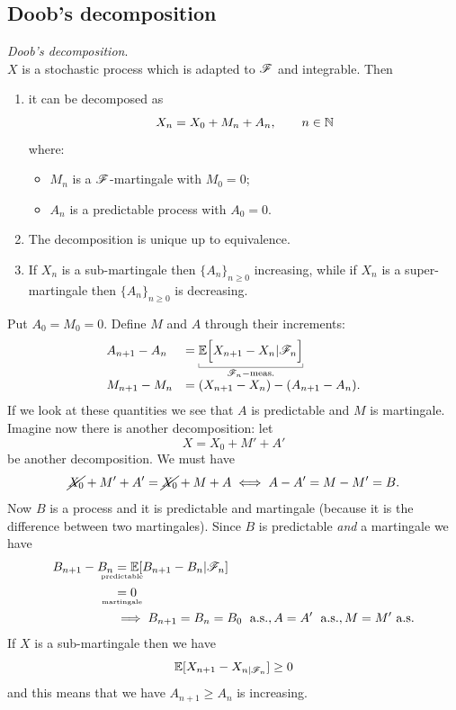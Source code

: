 \documentclass{report}
\begin{document}
\subsection{Doob’s decomposition}
\begin{theorem}
\emph{Doob's decomposition}.\\
$X$ is a stochastic process which is adapted to $\mathscr{F}$ and integrable. Then
\begin{enumerate}
	\item it can be decomposed as 
	\[X_{n}=X_{0}+M_{n}+A_{n},\qquad n\in\mathbb{N}\]
	where:
	\begin{itemize}
		\item $M_{n}$ is a $\mathscr{F}$-martingale with $M_0=0$;
		\item $A_{n}$ is a predictable process with $A_0=0$.
	\end{itemize}
	\item The decomposition is unique up to equivalence.
	\item If $X_{n}$ is a sub-martingale then ${\{A_{n}\}}_{n\geq0}$ increasing, while if $X_{n}$ is a super-martingale then ${\{A_{n}\}}_{n\geq0}$ is decreasing.
\end{enumerate}
\end{theorem}
\begin{fancyproof}
Put $A_0=M_0=0$. Define $M$ and $A$ through their increments:
\[ \begin{array}{l l}
	A_{n+1}-A_{n}&=\underbracket[0.3pt]{\ev\Big[X_{n+1}-X_{n}|\F_{n}\Big]}_{\F_{n}-\text{meas.}}\\
	M_{n+1}-M_{n}&=(X_{n+1}-X_{n})-(A_{n+1}-A_{n}).
\end{array} \]
If we look at these quantities we see that $A$ is predictable and $M$ is martingale. Imagine now there is another decomposition: let
\[X=X_0+M'+A'\]
be another decomposition. We must have
\[\cancel{X_0}+M'+A'=\cancel{X_0}+M+A\iff A-A'=M-M'=B.\]
Now $B$ is a process and it is predictable and martingale (because it is the difference between two martingales). Since $B$ is predictable \textit{and} a martingale we have
\begin{align*}
	B_{n+1}-B_{n}&\underset{\mathclap{\text{\tiny predictable}}}{=}\ev[B_{n+1}-B_{n}|\F_{n}]\\
	&\underset{\mathclap{\text{\tiny martingale}}}{=}0\\
	&\implies B_{n+1}=B_{n}=B_0\;\as,A=A'\;\as,M=M'\as\\
\end{align*}
If $X$ is a sub-martingale then we have
\[\mathbb{E}[X_{n+1}-X_{n|\mathscr{F}_{n}}]\geq0\]
and this means that we have $A_{n+1}\geq A_{n}$ is increasing.
\end{fancyproof}
\end{document}
